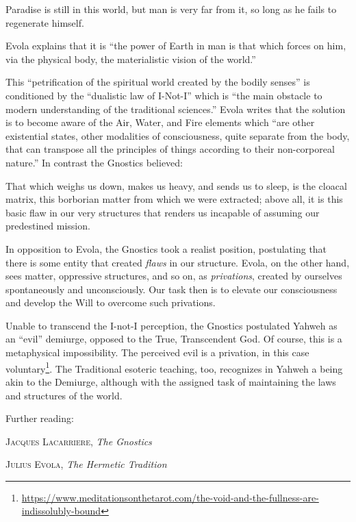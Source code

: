 \begin{quotex}
Paradise is still in this world, but man is very far from it, so long as he fails to regenerate himself.
\end{quotex}


Evola explains that it is ``the power of Earth in man is that which forces on him, via the physical body, the materialistic vision of the world.''

This ``petrification of the spiritual world created by the bodily senses'' is conditioned by the ``dualistic law of I-Not-I'' which is ``the main obstacle to modern understanding of the traditional sciences.'' Evola writes that the solution is to become aware of the Air, Water, and Fire elements which ``are other existential states, other modalities of consciousness, quite separate from the body, that can transpose all the principles of things according to their non-corporeal nature.'' In contrast the Gnostics believed:

\begin{quotex}
That which weighs us down, makes us heavy, and sends us to sleep, is the cloacal matrix, this borborian matter from which we were extracted; above all, it is this basic flaw in our very structures that renders us incapable of assuming our predestined mission.
\end{quotex}


In opposition to Evola, the Gnostics took a realist position, postulating that there is some entity that created \emph{flaws} in our structure. Evola, on the other hand, sees matter, oppressive structures, and so on, as \emph{privations}, created by ourselves spontaneously and unconsciously. Our task then is to elevate our consciousness and develop the Will to overcome such privations.

Unable to transcend the I-not-I perception, the Gnostics postulated Yahweh as an ``evil'' demiurge, opposed to the True, Transcendent God. Of course, this is a metaphysical impossibility. The perceived evil is a privation, in this case voluntary\footnote{\url{https://www.meditationsonthetarot.com/the-void-and-the-fullness-are-indissolubly-bound}}. The Traditional esoteric teaching, too, recognizes in Yahweh a being akin to the Demiurge, although with the assigned task of maintaining the laws and structures of the world.


Further reading:

\textsc{Jacques Lacarriere}, \textit{The Gnostics}

\textsc{Julius Evola}, \textit{The Hermetic Tradition}

